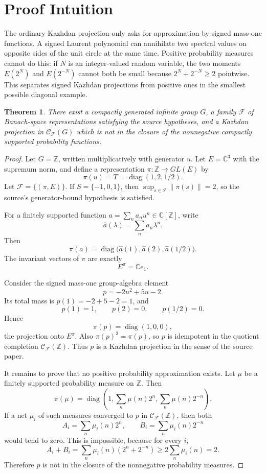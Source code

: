 \documentclass[11pt]{article}
\newtheorem{theorem}{Theorem}
\newcommand{\C}{\mathbb C}
\newcommand{\Z}{\mathbb Z}
\newcommand{\cF}{\mathcal F}
\newcommand{\cC}{\mathcal C}
\begin{document}
\section*{Proof Intuition}

The ordinary Kazhdan projection only asks for approximation by signed
mass-one functions. A signed Laurent polynomial can annihilate two spectral
values on opposite sides of the unit circle at the same time. Positive
probability measures cannot do this: if \(N\) is an integer-valued random
variable, the two moments \(E(2^N)\) and \(E(2^{-N})\) cannot both be small
because \(2^N+2^{-N}\geq 2\) pointwise. This separates signed Kazhdan
projections from positive ones in the smallest possible diagonal example.

\begin{theorem}
There exist a compactly generated infinite group \(G\), a family \(\cF\) of
Banach-space representations satisfying the source hypotheses, and a Kazhdan
projection in \(\cC_{\cF}(G)\) which is not in the closure of the nonnegative
compactly supported probability functions.
\end{theorem}

\begin{proof}
Let \(G=\Z\), written multiplicatively with generator \(u\). Let
\(E=\C^3\) with the supremum norm, and define a representation
\(\pi\colon \Z\to GL(E)\) by
\[
  \pi(u)=T=\operatorname{diag}(1,2,1/2).
\]
Let \(\cF=\{(\pi,E)\}\). If \(S=\{-1,0,1\}\), then
\(\sup_{s\in S}\|\pi(s)\|=2\), so the source's generator-bound hypothesis is
satisfied.

For a finitely supported function \(a=\sum_n a_n u^n\in \C[\Z]\), write
\[
  \widehat a(\lambda)=\sum_n a_n\lambda^n.
\]
Then
\[
  \pi(a)=\operatorname{diag}\bigl(\widehat a(1),
  \widehat a(2),\widehat a(1/2)\bigr).
\]
The invariant vectors of \(\pi\) are exactly
\[
  E^\pi=\C e_1.
\]

Consider the signed mass-one group-algebra element
\[
  p=-2u^2+5u-2.
\]
Its total mass is \(p(1)=-2+5-2=1\), and
\[
  p(1)=1,\qquad p(2)=0,\qquad p(1/2)=0.
\]
Hence
\[
  \pi(p)=\operatorname{diag}(1,0,0),
\]
the projection onto \(E^\pi\). Also \(\pi(p)^2=\pi(p)\), so \(p\) is
idempotent in the quotient completion \(\cC_{\cF}(\Z)\). Thus \(p\) is a
Kazhdan projection in the sense of the source paper.

It remains to prove that no positive probability approximation exists. Let
\(\mu\) be a finitely supported probability measure on \(\Z\). Then
\[
  \pi(\mu)=\operatorname{diag}
  \left(1,\sum_n \mu(n)2^n,\sum_n \mu(n)2^{-n}\right).
\]
If a net \(\mu_i\) of such measures converged to \(p\) in
\(\cC_{\cF}(\Z)\), then both
\[
  A_i=\sum_n \mu_i(n)2^n,\qquad
  B_i=\sum_n \mu_i(n)2^{-n}
\]
would tend to zero. This is impossible, because for every \(i\),
\[
  A_i+B_i
  =\sum_n \mu_i(n)(2^n+2^{-n})
  \geq 2\sum_n\mu_i(n)
  =2.
\]
Therefore \(p\) is not in the closure of the nonnegative probability measures.
\end{proof}
\end{document}
